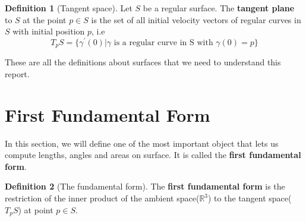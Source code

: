\documentclass{article}
\theoremstyle{plain}
\theoremstyle{definition}
\newtheorem{definition}{Definition}
\theoremstyle{remark}
\newcommand{\R}{\mathbb{R}}
\begin{document}
\begin{definition}[Tangent space]
    Let \(S\) be a regular surface. The \textbf{tangent plane} to \(S\) at the point \( p \in S\) is the set of all initial velocity vectors of regular curves in \(S\) with initial position \(p\), i.e \[ T_pS = \{ \gamma^\prime(0) | \gamma \text{ is a regular curve in S with }\gamma(0) = p\} \]
\end{definition}

These are all the definitions about surfaces that we need to understand this report.

\section{First Fundamental Form}
In this section, we will define one of the most important object that lets us compute lengths, angles and areas on surface. It is called the \textbf{first fundamental form}.

\begin{definition}[The fundamental form]
    The \textbf{first fundamental form} is the restriction of the inner product of the ambient space(\(\R^3\)) to the tangent space(\( T_pS\)) at point \( p \in S\).
\end{definition}
\end{document}
